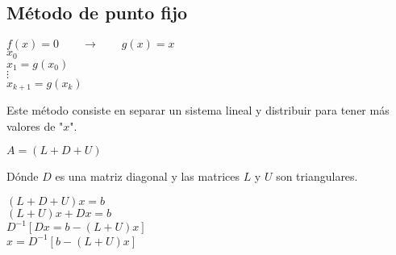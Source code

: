 \subsection{M\'etodo de punto fijo}
\begin{center}
$f(x)=0\qquad \rightarrow \qquad g(x)=x$ \\
$x_0$ \\
$x_1=g(x_0)$ \\
$\vdots$ \\
$x_{k+1}=g(x_k)$
\end{center}
Este m\'etodo consiste en separar un sistema lineal y distribuir para tener m\'as valores de "$x$".
\begin{center}
$A=(L+D+U)$
\end{center}
D\'onde $D$ es una matriz diagonal y las matrices $L$ y $U$ son triangulares.
\begin{center}
$(L+D+U)x=b$ \\
$(L+U)x+Dx=b$ \\
$D^{-1}[Dx=b-(L+U)x]$ \\
$x=D^{-1}[b-(L+U)x]$ \\
\end{center}
